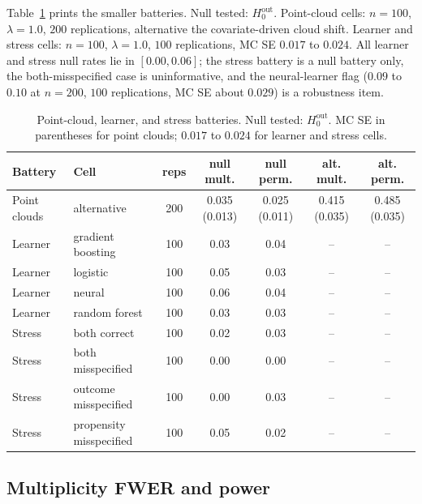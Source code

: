 Table~\ref{tab:batteries} prints the smaller batteries. Null tested: $H_0^{\mathrm{out}}$. Point-cloud cells: $n=100$, $\lambda=1.0$, $200$ replications, alternative the covariate-driven cloud shift. Learner and stress cells: $n=100$, $\lambda=1.0$, $100$ replications, MC SE $0.017$ to $0.024$. All learner and stress null rates lie in $[0.00,0.06]$; the stress battery is a null battery only, the both-misspecified case is uninformative, and the neural-learner flag ($0.09$ to $0.10$ at $n=200$, $100$ replications, MC SE about $0.029$) is a robustness item.

\begin{table}[t]
\centering
\small
\setlength{\tabcolsep}{3pt}
\begin{tabular}{@{}llccccc@{}}
\hline
Battery & Cell & reps & null mult. & null perm. & alt. mult. & alt. perm. \\
\hline
Point clouds & alternative & 200 & 0.035 (0.013) & 0.025 (0.011) & 0.415 (0.035) & 0.485 (0.035) \\
Learner & gradient boosting & 100 & 0.03 & 0.04 & -- & -- \\
Learner & logistic & 100 & 0.05 & 0.03 & -- & -- \\
Learner & neural & 100 & 0.06 & 0.04 & -- & -- \\
Learner & random forest & 100 & 0.03 & 0.03 & -- & -- \\
Stress & both correct & 100 & 0.02 & 0.03 & -- & -- \\
Stress & both misspecified & 100 & 0.00 & 0.00 & -- & -- \\
Stress & outcome misspecified & 100 & 0.00 & 0.03 & -- & -- \\
Stress & propensity misspecified & 100 & 0.05 & 0.02 & -- & -- \\
\hline
\end{tabular}
\caption{Point-cloud, learner, and stress batteries. Null tested: $H_0^{\mathrm{out}}$. MC SE in parentheses for point clouds; $0.017$ to $0.024$ for learner and stress cells.}
\label{tab:batteries}
\end{table}

\subsection{Multiplicity FWER and power}
\label{app:multiplicity-tab}

